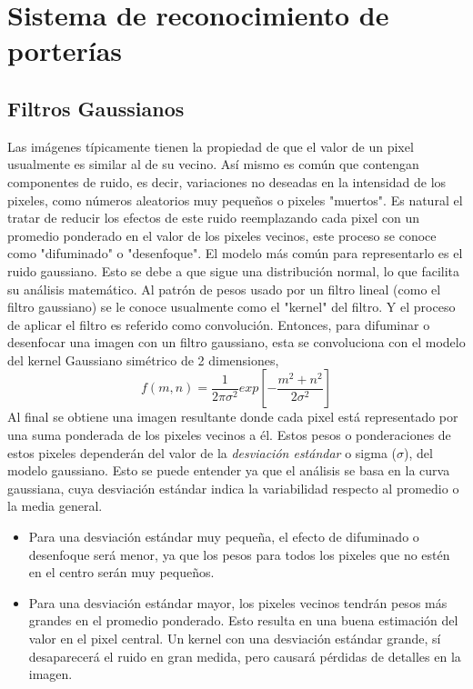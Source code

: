 \chapter{Sistema de reconocimiento de porterías}\label{sec:porteria}

\section{Filtros Gaussianos}
Las imágenes típicamente tienen la propiedad de que el valor de un pixel usualmente es similar al de su vecino. Así mismo es común que contengan componentes de ruido, es decir, variaciones no deseadas en la intensidad de los pixeles, como números aleatorios muy pequeños o pixeles "muertos". Es natural el tratar de reducir los efectos de este ruido reemplazando cada pixel con un promedio ponderado en el valor de los pixeles vecinos, este proceso se conoce como "difuminado" o "desenfoque".  El modelo más común para representarlo es el ruido gaussiano. Esto se debe a que sigue una distribución normal, lo que facilita su análisis matemático. Al patrón de pesos usado por un filtro lineal (como el filtro gaussiano) se le conoce usualmente como el "kernel" del filtro. Y el proceso de aplicar el filtro es referido como convolución.\cite{forsyth2002computer} Entonces, para difuminar o desenfocar una imagen con un filtro gaussiano, esta se convoluciona con el modelo del kernel Gaussiano simétrico de 2 dimensiones, 
\begin{equation}
\label{eq:pythagorean}
f(m,n)=\frac{1}{2\pi \sigma^2}exp[-\frac{m^2+n^2}{2\sigma^2} ]
\end{equation}
Al final se obtiene una imagen resultante donde cada pixel está representado por una suma ponderada de los pixeles vecinos a él. Estos pesos o ponderaciones de estos pixeles dependerán del valor de la \textit{desviación estándar} o sigma ($\sigma$), del modelo gaussiano.\cite{prince2012computer} Esto se puede entender ya que el análisis se basa en la curva gaussiana, cuya desviación estándar indica la variabilidad respecto al promedio o la media general.
\begin{itemize}
	\item Para una desviación estándar muy pequeña, el efecto de difuminado o desenfoque será menor, ya que los pesos para todos los pixeles que no estén en el centro serán muy pequeños.
	\item Para una desviación estándar mayor, los pixeles vecinos tendrán pesos más grandes en el promedio ponderado. Esto resulta en una buena estimación del valor en el pixel central. Un kernel con una desviación estándar grande, sí desaparecerá el ruido en gran medida, pero causará pérdidas de detalles en la imagen.\cite{forsyth2002computer}
\end{itemize}

